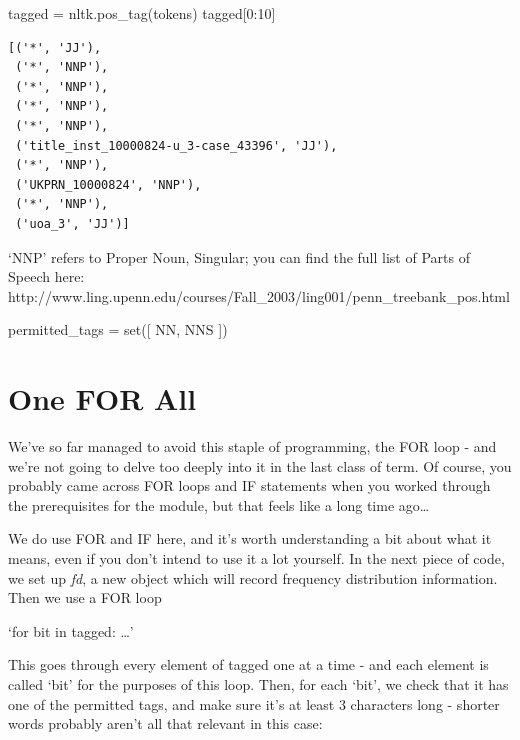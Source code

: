 \documentclass[
  letterpaper,
  DIV=11,
  numbers=noendperiod]{scrreprt}
\newenvironment{Shaded}{\begin{snugshade}}{\end{snugshade}}
\newcommand{\BuiltInTok}[1]{\textcolor[rgb]{0.00,0.23,0.31}{#1}}
\newcommand{\DecValTok}[1]{\textcolor[rgb]{0.68,0.00,0.00}{#1}}
\newcommand{\NormalTok}[1]{\textcolor[rgb]{0.00,0.23,0.31}{#1}}
\newcommand{\OperatorTok}[1]{\textcolor[rgb]{0.37,0.37,0.37}{#1}}
\newcommand{\StringTok}[1]{\textcolor[rgb]{0.13,0.47,0.30}{#1}}
\begin{document}
\begin{Shaded}
\begin{Highlighting}[]
\NormalTok{tagged }\OperatorTok{=}\NormalTok{ nltk.pos\_tag(tokens)}
\NormalTok{tagged[}\DecValTok{0}\NormalTok{:}\DecValTok{10}\NormalTok{]}
\end{Highlighting}
\end{Shaded}

\begin{verbatim}
[('*', 'JJ'),
 ('*', 'NNP'),
 ('*', 'NNP'),
 ('*', 'NNP'),
 ('*', 'NNP'),
 ('title_inst_10000824-u_3-case_43396', 'JJ'),
 ('*', 'NNP'),
 ('UKPRN_10000824', 'NNP'),
 ('*', 'NNP'),
 ('uoa_3', 'JJ')]
\end{verbatim}

`NNP' refers to Proper Noun, Singular; you can find the full list of
Parts of Speech here:
http://www.ling.upenn.edu/courses/Fall\_2003/ling001/penn\_treebank\_pos.html

\begin{Shaded}
\begin{Highlighting}[]
\NormalTok{permitted\_tags }\OperatorTok{=} \BuiltInTok{set}\NormalTok{([}
    \StringTok{\textquotesingle{}NN\textquotesingle{}}\NormalTok{,}
    \StringTok{\textquotesingle{}NNS\textquotesingle{}}
\NormalTok{])}
\end{Highlighting}
\end{Shaded}

\hypertarget{one-for-all}{%
\section{One FOR All}\label{one-for-all}}

We've so far managed to avoid this staple of programming, the FOR loop -
and we're not going to delve too deeply into it in the last class of
term. Of course, you probably came across FOR loops and IF statements
when you worked through the prerequisites for the module, but that feels
like a long time ago\ldots{}

We do use FOR and IF here, and it's worth understanding a bit about what
it means, even if you don't intend to use it a lot yourself. In the next
piece of code, we set up \emph{fd}, a new object which will record
frequency distribution information. Then we use a FOR loop

`for bit in tagged: \ldots'

This goes through every element of tagged one at a time - and each
element is called `bit' for the purposes of this loop. Then, for each
`bit', we check that it has one of the permitted tags, and make sure
it's at least 3 characters long - shorter words probably aren't all that
relevant in this case:
\end{document}
